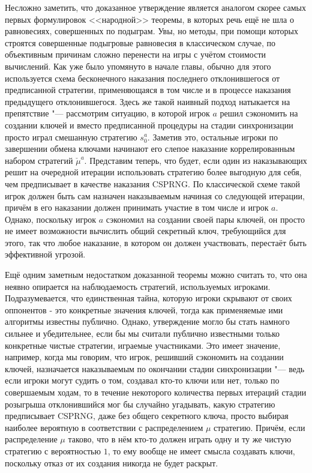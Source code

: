 Несложно заметить, что доказанное утверждение является аналогом скорее самых первых формулировок <<народной>> теоремы, в которых речь ещё не шла о равновесиях, совершенных по подыграм. Увы, но методы, при помощи которых строятся совершенные подыгровые равновесия в классическом случае, по объективным причинам сложно перенести на игры с учётом стоимости вычислений. Как уже было упомянуто в начале главы, обычно для этого используется схема бесконечного наказания последнего отклонившегося от предписанной стратегии, применяющаяся в том числе и в процессе наказания предыдущего отклонившегося. Здесь же такой наивный подход натыкается на препятствие "--- рассмотрим ситуацию, в которой игрок $a$ решил сэкономить на создании ключей и вместо предписанной процедуры на стадии синхронизации просто играл смешанную стратегию $s_0^a$. Заметив это, остальные игроки по завершении обмена ключами начинают его слепое наказание коррелированным набором стратегий $\check{\mu}^a$. Представим теперь, что будет, если один из наказывающих решит на очередной итерации использовать стратегию более выгодную для себя, чем предписывает в качестве наказания CSPRNG. По классической схеме такой игрок должен быть сам назначен наказываемым начиная со следующей итерации, причём в его наказании должен принимать участие в том числе и игрок $a$. Однако, поскольку игрок $a$ сэкономил на создании своей пары ключей, он просто не имеет возможности вычислить общий секретный ключ, требующийся для этого, так что любое наказание, в котором он должен участвовать, перестаёт быть эффективной угрозой.

Ещё одним заметным недостатком доказанной теоремы можно считать то, что она неявно опирается на наблюдаемость стратегий, используемых игроками. Подразумевается, что единственная тайна, которую игроки скрывают от своих оппонентов - это конкретные значения ключей, тогда как применяемые ими алгоритмы известны публично. Однако, утверждение могло бы стать намного сильнее и убедительнее, если бы мы считали публично известными только конкретные чистые стратегии, играемые участниками. Это имеет значение, например, когда мы говорим, что игрок, решивший сэкономить на создании ключей, назначается наказываемым по окончании стадии синхронизации "--- ведь если игроки могут судить о том, создавал кто-то ключи или нет, только по совершаемым ходам, то в течение некоторого количества первых итераций стадии розыгрыша отклонившийся мог бы случайно угадывать, какую стратегию предписывает CSPRNG, даже без общего секретного ключа, просто выбирая наиболее вероятную в соответствии с распределением $\mu$ стратегию. Причём, если распределение $\mu$ таково, что в нём кто-то должен играть одну и ту же чистую стратегию с вероятностью $1$, то ему вообще не имеет смысла создавать ключи, поскольку отказ от их создания никогда не будет раскрыт.

